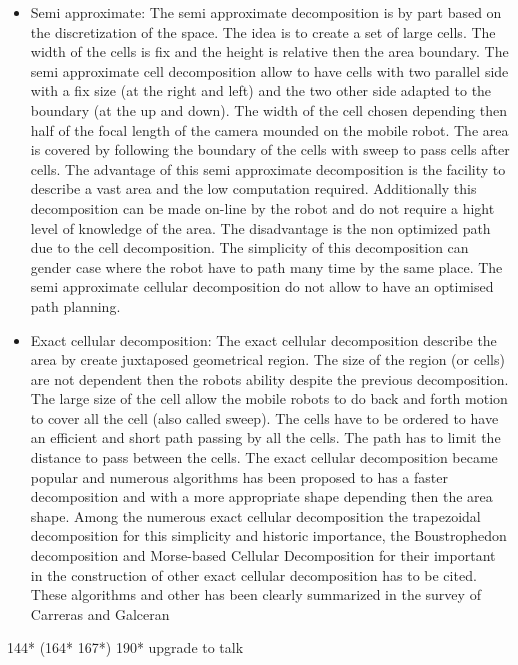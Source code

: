 \begin{itemize}
	\item Semi approximate: 
	 The semi approximate decomposition is by part based on the discretization of the space. The idea is to create a set of large cells. The width of the cells is fix and the height is relative then the area boundary. 
	 The semi approximate cell decomposition allow to have cells with two parallel side  with a fix size  (at the right and left) and  the  two other side adapted to the boundary (at the up and down).  The width  of  the cell chosen depending then half of the focal length of the camera mounded on the mobile robot. The area is covered by following the boundary of the cells with sweep to pass cells  after cells.
	 The advantage of this semi approximate decomposition is the facility to describe a vast area and the low computation required. Additionally this decomposition can be made on-line by the robot and do not require a hight level of knowledge of the area. The disadvantage is the non optimized path due to the cell decomposition. The simplicity  of this decomposition  can gender case where the robot have to path many time by the same place. The semi approximate cellular decomposition do not allow to have an optimised path planning. 
	\item Exact cellular decomposition: 
	The exact cellular decomposition describe the area by create juxtaposed geometrical region. The size of the region (or cells) are not dependent then the robots ability despite the previous decomposition. The large size of the cell allow the  mobile robots to  do back and forth motion to cover all the cell (also called sweep).  The cells have to be ordered to have an efficient and short path passing by all the cells. The path has to limit the distance to pass  between the cells.
	The exact cellular decomposition became popular and numerous algorithms has been proposed to has  a faster decomposition and with a more appropriate shape depending then the area shape. 
	Among the numerous exact cellular decomposition the trapezoidal decomposition for this simplicity and historic importance, the Boustrophedon decomposition  and  Morse-based Cellular Decomposition for their important in the construction of other exact cellular decomposition has to be cited. These algorithms and other has been clearly summarized in the survey of Carreras and Galceran \citep{66*galceran2013} 
	
\end{itemize}

144* (164* 167*) 190* upgrade to talk

